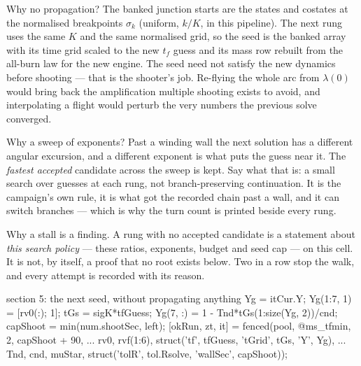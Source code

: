\documentclass[11pt]{article}
\newcommand{\tf}{t_f}\newcommand{\R}{\mathbb{R}}
\begin{document}
\begin{intu}
Why no propagation? The banked junction starts are the states and costates
at the normalised breakpoints $\sigma_k$ (uniform, $k/K$, in this pipeline).
The next rung uses the same $K$ and the same normalised grid, so the seed is
the banked array with its time grid scaled to the new $\tf$ guess and its
mass row rebuilt from the all-burn law for the new engine. The seed need not
satisfy the new dynamics before shooting --- that is the shooter's job.
Re-flying the whole arc from $\lambda(0)$ would bring back the
amplification multiple shooting exists to avoid, and interpolating a flight
would perturb the very numbers the previous solve converged.

Why a sweep of exponents? Past a winding wall the next solution has a
different angular excursion, and a different exponent is what puts the
guess near it. The \emph{fastest accepted} candidate across the sweep is
kept. Say what that is: a small search over guesses at each rung, not
branch-preserving continuation. It is the campaign's own rule, it is what
got the recorded chain past a wall, and it can switch branches --- which is
why the turn count is printed beside every rung.

Why a stall is a finding. A rung with no accepted candidate is a statement
about \emph{this search policy} --- these ratios, exponents, budget and seed
cap --- on this cell. It is not, by itself, a proof that no root exists
below. Two in a row stop the walk, and every attempt is recorded with its
reason.
\end{intu}

\begin{snippet}{section 5: the next seed, without propagating anything}
Yg = itCur.Y;  Yg(1:7, 1) = [rv0(:); 1];
tGs = sigK*tfGuess;
Yg(7, :) = 1 - Tnd*tGs(1:size(Yg, 2))/cnd;
capShoot = min(num.shootSec, left);
[okRun, zt, it] = fenced(pool, @ms_tfmin, 2, capShoot + 90, ...
    rv0, rvf(1:6), struct('tf', tfGuess, 'tGrid', tGs, 'Y', Yg), ...
    Tnd, cnd, muStar, struct('tolR', tol.Rsolve, 'wallSec', capShoot));
\end{snippet}
\end{document}
